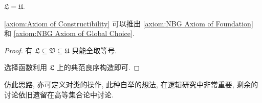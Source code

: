 \begin{axiom}
    \label {axiom:Axiom of Constructibility}
    \(\mathfrak{L} = \mathfrak{U}\).
\end{axiom}

\begin{lemma}
    \ref{axiom:Axiom of Constructibility} 可以推出 \ref{axiom:NBG Axiom of Foundation} 和 \ref{axiom:NBG Axiom of Global Choice}.

    \begin{proof}
        有 \(\mathfrak{L} \subseteq \mathfrak{V} \subseteq \mathfrak{U}\) 只能全取等号.
        
        选择函数利用 \(\mathfrak{L}\) 上的典范良序构造即可.
    \end{proof}
\end{lemma}

仿此思路, 亦可定义对类的操作, 此种自举的想法, 在逻辑研究中非常重要, 剩余的讨论依旧遗留在高等集合论中讨论.

